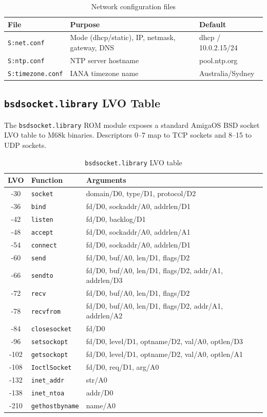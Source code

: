 \documentclass[11pt,a4paper]{report}
\begin{document}
\begin{table}[h]
\centering
\begin{tabular}{lll}
\toprule
\textbf{File} & \textbf{Purpose} & \textbf{Default} \\
\midrule
\texttt{S:net.conf} & Mode (dhcp/static), IP, netmask, gateway, DNS & dhcp / 10.0.2.15/24 \\
\texttt{S:ntp.conf} & NTP server hostname & pool.ntp.org \\
\texttt{S:timezone.conf} & IANA timezone name & Australia/Sydney \\
\bottomrule
\end{tabular}
\caption{Network configuration files}
\end{table}

\subsection{\texttt{bsdsocket.library} LVO Table}

The \texttt{bsdsocket.library} ROM module exposes a standard AmigaOS BSD
socket LVO table to M68k binaries.  Descriptors 0--7 map to TCP sockets and
8--15 to UDP sockets.

\begin{table}[h]
\centering
\begin{tabular}{cll}
\toprule
\textbf{LVO} & \textbf{Function} & \textbf{Arguments} \\
\midrule
-30 & \texttt{socket} & domain/D0, type/D1, protocol/D2 \\
-36 & \texttt{bind} & fd/D0, sockaddr/A0, addrlen/D1 \\
-42 & \texttt{listen} & fd/D0, backlog/D1 \\
-48 & \texttt{accept} & fd/D0, sockaddr/A0, addrlen/A1 \\
-54 & \texttt{connect} & fd/D0, sockaddr/A0, addrlen/D1 \\
-60 & \texttt{send} & fd/D0, buf/A0, len/D1, flags/D2 \\
-66 & \texttt{sendto} & fd/D0, buf/A0, len/D1, flags/D2, addr/A1, addrlen/D3 \\
-72 & \texttt{recv} & fd/D0, buf/A0, len/D1, flags/D2 \\
-78 & \texttt{recvfrom} & fd/D0, buf/A0, len/D1, flags/D2, addr/A1, addrlen/A2 \\
-84 & \texttt{closesocket} & fd/D0 \\
-96 & \texttt{setsockopt} & fd/D0, level/D1, optname/D2, val/A0, optlen/D3 \\
-102 & \texttt{getsockopt} & fd/D0, level/D1, optname/D2, val/A0, optlen/A1 \\
-108 & \texttt{IoctlSocket} & fd/D0, req/D1, arg/A0 \\
-132 & \texttt{inet\_addr} & str/A0 \\
-138 & \texttt{inet\_ntoa} & addr/D0 \\
-210 & \texttt{gethostbyname} & name/A0 \\
\bottomrule
\end{tabular}
\caption{\texttt{bsdsocket.library} LVO table}
\end{table}
\end{document}
